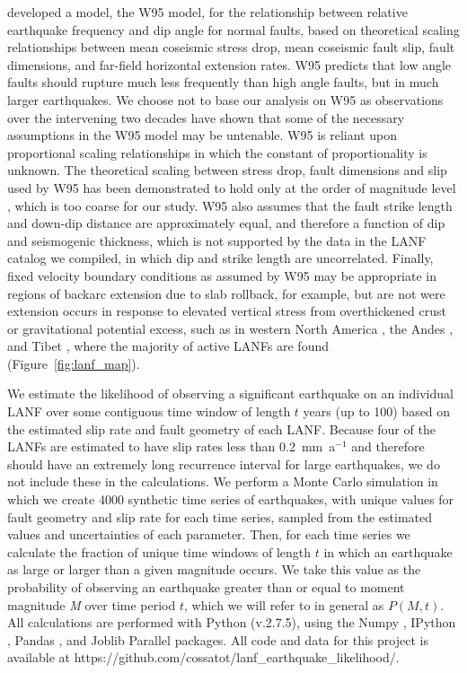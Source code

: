\documentclass[draft,grl]{AGUTeX}
\begin{document}
\begin{article}
\citet{wernicke1995seis} developed a model, the W95 model, for the relationship
between relative earthquake frequency and dip angle for normal faults, based on
theoretical scaling relationships between mean coseismic stress drop, mean
coseismic fault slip, fault dimensions, and far-field horizontal extension
rates. W95 predicts that low angle faults should rupture much less frequently
than high angle faults, but in much larger earthquakes. We choose not to base
our analysis on W95 as observations over the intervening two decades have shown
that some of the necessary assumptions in the W95 model may be untenable. W95
is reliant upon proportional scaling relationships in which the constant of
proportionality is unknown. The theoretical scaling between stress drop, fault
dimensions and slip used by W95 has been demonstrated to hold only at the order
of magnitude level \citep{leonard2010}, which is too coarse for our study. W95
also assumes that the fault strike length and down-dip distance are
approximately equal, and therefore a function of dip and seismogenic thickness,
which is not supported by the data in the LANF catalog we compiled, in which
dip and strike length are uncorrelated. Finally, fixed velocity boundary
conditions as assumed by W95 may be appropriate in regions of backarc extension
due to slab rollback, for example, but are not were extension occurs in
response to elevated vertical stress from overthickened crust or gravitational
potential excess, such as in western North America \citep{jones1996}, the Andes
\citep{dalmayrac1981}, and Tibet \citep{harrison1992}, where the majority of
active LANFs are found (Figure~\ref{fig:lanf_map}).

We estimate the likelihood of observing a significant earthquake on an
individual LANF over some contiguous time window of length $t$ years (up to
100) based on the estimated slip rate and fault geometry of each LANF. Because
four of the LANFs are estimated  to have slip rates less than 0.2~mm~a$^{-1}$
\citep{usgs_qfaults} and therefore should have an extremely long recurrence
interval for large earthquakes, we do not include these in the calculations. We
perform a Monte Carlo simulation in which we create 4000 synthetic time series
of earthquakes, with unique values for fault geometry and slip rate for each
time series, sampled from the estimated values and uncertainties of each
parameter. Then, for each time series we calculate the fraction of unique time
windows of length $t$ in which an earthquake as large or larger than a given
magnitude occurs. We take this value as the probability of observing an
earthquake greater than or equal to moment magnitude \emph{M} over time period
$t$, which we will refer to in general as $P(M,t)$. All calculations are
performed with Python (v.2.7.5), using the Numpy \citep{oliphant2007numpy},
IPython \citep{perez2007ipython}, Pandas \citep{mckinney-proc-scipy-2010}, and
Joblib Parallel \citep{varoquaux_joblib} packages.  All code and data for this
project is available at
https://github.com/cossatot/lanf\_earthquake\_likelihood/.


\end{article}
\end{document}
